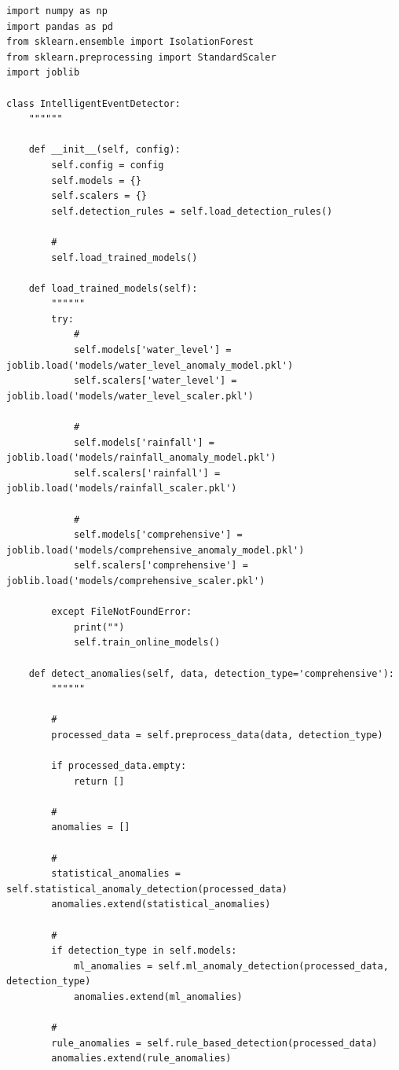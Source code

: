 \begin{lstlisting}[style=python]
import numpy as np
import pandas as pd
from sklearn.ensemble import IsolationForest
from sklearn.preprocessing import StandardScaler
import joblib

class IntelligentEventDetector:
    """"""
    
    def __init__(self, config):
        self.config = config
        self.models = {}
        self.scalers = {}
        self.detection_rules = self.load_detection_rules()
        
        # 
        self.load_trained_models()
    
    def load_trained_models(self):
        """"""
        try:
            # 
            self.models['water_level'] = joblib.load('models/water_level_anomaly_model.pkl')
            self.scalers['water_level'] = joblib.load('models/water_level_scaler.pkl')
            
            # 
            self.models['rainfall'] = joblib.load('models/rainfall_anomaly_model.pkl')
            self.scalers['rainfall'] = joblib.load('models/rainfall_scaler.pkl')
            
            # 
            self.models['comprehensive'] = joblib.load('models/comprehensive_anomaly_model.pkl')
            self.scalers['comprehensive'] = joblib.load('models/comprehensive_scaler.pkl')
            
        except FileNotFoundError:
            print("")
            self.train_online_models()
    
    def detect_anomalies(self, data, detection_type='comprehensive'):
        """"""
        
        # 
        processed_data = self.preprocess_data(data, detection_type)
        
        if processed_data.empty:
            return []
        
        # 
        anomalies = []
        
        # 
        statistical_anomalies = self.statistical_anomaly_detection(processed_data)
        anomalies.extend(statistical_anomalies)
        
        # 
        if detection_type in self.models:
            ml_anomalies = self.ml_anomaly_detection(processed_data, detection_type)
            anomalies.extend(ml_anomalies)
        
        # 
        rule_anomalies = self.rule_based_detection(processed_data)
        anomalies.extend(rule_anomalies)
        

\end{lstlisting}

